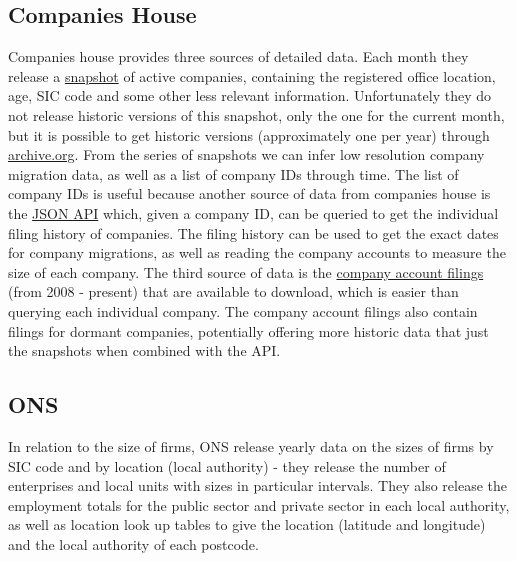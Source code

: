 \documentclass[a4paper,10pt]{article}
\begin{document}
\subsection{Companies House}
Companies house provides three sources of detailed data. Each month they release a \href{http://download.companieshouse.gov.uk/en_output.html}{snapshot} of active companies, containing the registered office location, age, SIC code and some other less relevant information. Unfortunately they do not release historic versions of this snapshot, only the one for the current month, but it is possible to get historic versions (approximately one per year) through \href{https://web.archive.org/web/*/http://download.companieshouse.gov.uk/en_output.html}{archive.org}. From the series of snapshots we can infer low resolution company migration data, as well as a list of company IDs through time. The list of company IDs is useful because another source of data from companies house is the \href{https://developer.companieshouse.gov.uk/api/docs/}{JSON API} which, given a company ID, can be queried to get the individual filing history of companies. The filing history can be used to get the exact dates for company migrations, as well as reading the company accounts to measure the size of each company. The third source of data is the \href{http://download.companieshouse.gov.uk/historicmonthlyaccountsdata.html}{company account filings} (from 2008 - present) that are available to download, which is easier than querying each individual company. The company account filings also contain filings for dormant companies, potentially offering more historic data that just the snapshots when combined with the API.

\subsection{ONS}
In relation to the size of firms, ONS release yearly data on the sizes of firms by SIC code and by location (local authority) - they release the number of enterprises and local units with sizes in particular intervals. They also release the employment totals for the public sector and private sector in each local authority, as well as location look up tables to give the location (latitude and longitude) and the local authority of each postcode.
\end{document}
